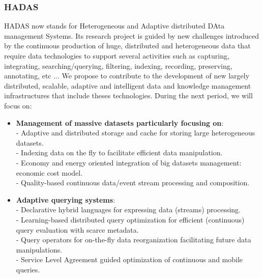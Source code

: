 \subsubsection*{HADAS}

HADAS now stands for Heterogeneous and Adaptive distributed DAta management Systems.  Its research project is guided by new challenges introduced by the continuous production of huge, distributed and heterogeneous data that require data technologies to support  several activities  such as capturing, integrating, searching/querying, filtering, indexing, recording, preserving, annotating, etc ...  
We propose to contribute to the development of new largely distributed, scalable, adaptive and intelligent data and knowledge management infrastructures that include theses technologies. 
During the next period, we will focus on:

\begin{itemize}
\item {\bf Management of massive datasets particularly focusing on}: \\
- Adaptive and distributed storage and cache for storing large heterogeneous datasets.\\
- Indexing data on the fly to facilitate efficient data manipulation.\\
- Economy and energy oriented integration of big datasets management: economic cost model.\\
- Quality-based continuous data/event stream processing and composition.

\item {\bf Adaptive querying systems}: \\
- Declarative hybrid languages for expressing data (streams) processing.\\
- Learning-based distributed query optimization for efficient (continuous) query evaluation with scarce metadata.\\
- Query operators for on-the-fly data reorganization facilitating future data manipulations.\\
- Service Level Agreement  guided optimization of continuous and mobile queries. 

\end{itemize}


